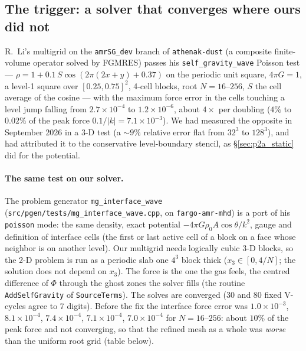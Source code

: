 \documentclass[11pt]{article}
\newcommand{\code}[1]{\texttt{#1}}
\newcommand{\file}[1]{\texttt{#1}}
\newcommand{\fn}[1]{\texttt{#1}}
\begin{document}
\subsection{The trigger: a solver that converges where ours did not}
R.~Li's multigrid on the \code{amrSG\_dev} branch of \code{athenak-dust} (a composite
finite-volume operator solved by FGMRES) passes his \code{self\_gravity\_wave} Poisson test
--- $\rho = 1 + 0.1\,S\cos(2\pi(2x + y) + 0.37)$ on the periodic unit square, $4\pi G = 1$,
a level-1 square over $[0.25, 0.75]^2$, 4-cell blocks, root $N = 16$--$256$, $S$ the cell
average of the cosine --- with the maximum force error in the cells touching a level jump
falling from $2.7\times10^{-4}$ to $1.2\times10^{-6}$, about $4\times$ per doubling ($4\%$ to
$0.02\%$ of the peak force $0.1/|k| = 7.1\times10^{-3}$). We had measured the opposite in
September 2026 in a 3-D test (a $\sim\!9\%$ relative error flat from $32^3$ to $128^3$), and
had attributed it to the conservative level-boundary stencil, as \S\ref{sec:p2a_static}
did for the potential.

\paragraph{The same test on our solver.} The problem generator \code{mg\_interface\_wave}
(\file{src/pgen/tests/}\allowbreak\file{mg\_interface\_wave.cpp}, on \code{fargo-amr-mhd}) is a port of his \code{poisson} mode: the
same density, exact potential $-4\pi G\rho_0 A\cos\theta/k^2$, gauge and definition of
interface cells (the first or last active cell of a block on a face whose neighbor is on
another level). Our multigrid needs logically cubic 3-D blocks, so the 2-D problem is run
as a periodic slab one $4^3$ block thick ($x_3 \in [0, 4/N]$; the solution does not depend
on $x_3$). The force is the one the gas feels, the centred difference of $\Phi$ through the
ghost zones the solver fills (the routine \fn{AddSelfGravity} of \fn{SourceTerms}). The solves are converged
(30 and 80 fixed V-cycles agree to 7 digits). Before the fix the interface force error was
$1.0\times10^{-3}$, $8.1\times10^{-4}$, $7.4\times10^{-4}$, $7.1\times10^{-4}$,
$7.0\times10^{-4}$ for $N = 16$--$256$: about $10\%$ of the peak force and not converging, so
that the refined mesh as a whole was \emph{worse} than the uniform root grid (table below).
\end{document}

